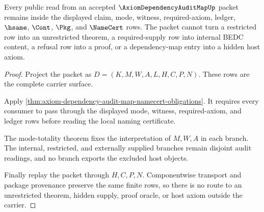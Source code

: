 \begin{theorem}
\label{thm:axiom-dependency-audit-map-nonescape}
Every public read from an accepted $\AxiomDependencyAuditMapUp$ packet remains inside the displayed claim, mode, witness, required-axiom, ledger, $\hsame$, $\Cont$, $\Pkg$, and $\NameCert$ rows. The packet cannot turn a restricted row into an unrestricted theorem, a required-supply row into internal BEDC content, a refusal row into a proof, or a dependency-map entry into a hidden host axiom.
\end{theorem}
\begin{proof}
Project the packet as $D=(K,M,W,A,L,H,C,P,N)$. These rows are the complete carrier surface.

Apply \autoref{thm:axiom-dependency-audit-map-namecert-obligations}. It requires every consumer to pass through the displayed mode, witness, required-axiom, and ledger rows before reading the local naming certificate.

The mode-totality theorem fixes the interpretation of $M,W,A$ in each branch. The internal, restricted, and externally supplied branches remain disjoint audit readings, and no branch exports the excluded host objects.

Finally replay the packet through $H,C,P,N$. Componentwise transport and package provenance preserve the same finite rows, so there is no route to an unrestricted theorem, hidden supply, proof oracle, or host axiom outside the carrier.
\end{proof}

